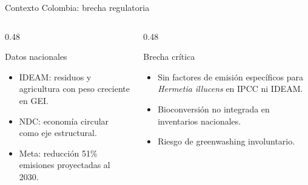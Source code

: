 \documentclass[aspectratio=169, 11pt]{beamer}
\newcommand{\BSF}{\textit{Hermetia illucens}}
\begin{document}
\begin{frame}{Contexto Colombia: brecha regulatoria}
    \begin{columns}[T]
        \begin{column}{0.48\textwidth}
            \begin{block}{Datos nacionales}
                \begin{itemize}
                    \item IDEAM: residuos y agricultura con peso creciente en GEI.
                    \item NDC: econom\'{i}a circular como eje estructural.
                    \item Meta: reducci\'{o}n 51\% emisiones proyectadas al 2030.
                \end{itemize}
            \end{block}
        \end{column}
        \begin{column}{0.48\textwidth}
            \begin{alertblock}{Brecha cr\'{i}tica}
                \begin{itemize}
                    \item Sin factores de emisi\'{o}n espec\'{i}ficos para \BSF{} en IPCC ni IDEAM.
                    \item Bioconversi\'{o}n no integrada en inventarios nacionales.
                    \item Riesgo de greenwashing involuntario.
                \end{itemize}
            \end{alertblock}
        \end{column}
    \end{columns}
\end{frame}
\end{document}
